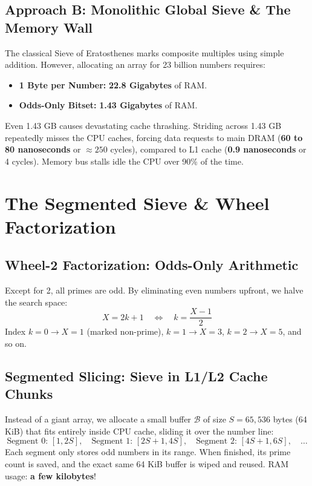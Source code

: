 \documentclass[11pt,a4paper]{article}
\begin{document}
\subsection{Approach B: Monolithic Global Sieve \& The Memory Wall}
The classical Sieve of Eratosthenes marks composite multiples using simple addition. However, allocating an array for 23 billion numbers requires:
\begin{itemize}\setlength{\itemsep}{0pt}
    \item \textbf{1 Byte per Number:} \textbf{22.8 Gigabytes} of RAM.
    \item \textbf{Odds-Only Bitset:} \textbf{1.43 Gigabytes} of RAM.
\end{itemize}
Even 1.43 GB causes devastating cache thrashing. Striding across 1.43 GB repeatedly misses the CPU caches, forcing data requests to main DRAM (\textbf{60 to 80 nanoseconds} or $\approx 250$ cycles), compared to L1 cache (\textbf{0.9 nanoseconds} or 4 cycles). Memory bus stalls idle the CPU over 90\% of the time.

\newpage

\section{The Segmented Sieve \& Wheel Factorization}

\subsection{Wheel-2 Factorization: Odds-Only Arithmetic}
Except for 2, all primes are odd. By eliminating even numbers upfront, we halve the search space:
\begin{equation}
    X = 2k + 1 \quad \iff \quad k = \frac{X - 1}{2}
\end{equation}
Index $k = 0 \to X = 1$ (marked non-prime), $k = 1 \to X = 3$, $k = 2 \to X = 5$, and so on.

\subsection{Segmented Slicing: Sieve in L1/L2 Cache Chunks}
Instead of a giant array, we allocate a small buffer $\mathcal{B}$ of size $S = 65,536$ bytes (64 KiB) that fits entirely inside CPU cache, sliding it over the number line:
\[ \text{Segment 0: } [1, 2S], \quad \text{Segment 1: } [2S+1, 4S], \quad \text{Segment 2: } [4S+1, 6S], \quad \dots \]
Each segment only stores odd numbers in its range. When finished, its prime count is saved, and the exact same 64 KiB buffer is wiped and reused. RAM usage: \textbf{a few kilobytes}!
\end{document}
